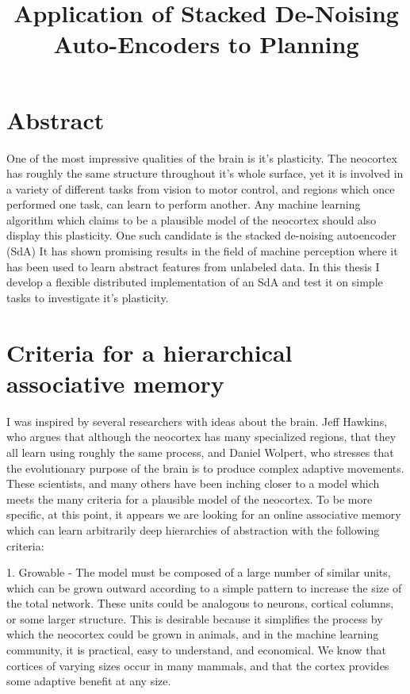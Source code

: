 \documentclass[12pt]{article}
\begin{document}
         

\section{Abstract}
\label{Abstract}
\doublespacing

One of the most impressive qualities of the brain is it's plasticity. The neocortex has roughly the same structure throughout it's whole surface, yet it is involved in a variety of different tasks from vision to motor control, and regions which once performed one task, can learn to perform another. Any machine learning algorithm which claims to be a plausible model of the neocortex should also display this plasticity. One such candidate is the stacked de-noising autoencoder (SdA) It has shown promising results in the field of machine perception where it has been used to learn abstract features from unlabeled data. In this thesis I develop a flexible distributed implementation of an SdA and test it on simple tasks to investigate it's plasticity.

\title{Application of Stacked De-Noising Auto-Encoders to Planning}
\section{Criteria for a hierarchical associative memory}

I was inspired by several researchers with ideas about the brain. Jeff Hawkins, who argues that although the neocortex has many specialized regions, that they all learn using roughly the same process, and Daniel Wolpert, who stresses that the evolutionary purpose of the brain is to produce complex adaptive movements. These scientists, and many others have been inching closer to a model which meets the many criteria for a plausible model of the neocortex. To be more specific, at this point, it appears we are looking for an online associative memory which can learn arbitrarily deep hierarchies of abstraction with the following criteria:

1. Growable - The model must be composed of a large number of similar units, which can be grown outward according to a simple pattern to increase the size of the total network. These units could be analogous to neurons, cortical columns, or some larger structure. This is desirable because it simplifies the process by which the neocortex could be grown in animals, and in the machine learning community, it is practical, easy to understand, and economical. We know that cortices of varying sizes occur in many mammals, and that the cortex provides some adaptive benefit at any size.
\end{document}
